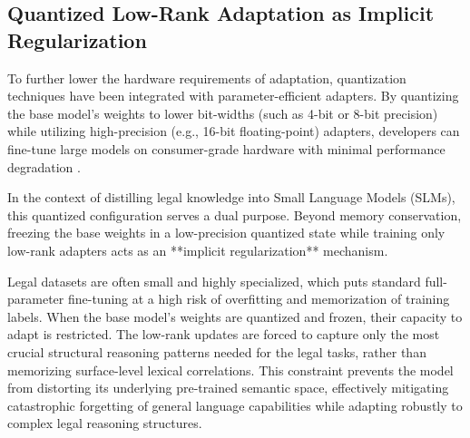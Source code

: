 \subsection{Quantized Low-Rank Adaptation as Implicit Regularization}

To further lower the hardware requirements of adaptation, quantization techniques have been integrated with parameter-efficient adapters. By quantizing the base model's weights to lower bit-widths (such as 4-bit or 8-bit precision) while utilizing high-precision (e.g., 16-bit floating-point) adapters, developers can fine-tune large models on consumer-grade hardware with minimal performance degradation \parencite{dettmers2022llmint88bitmatrixmultiplication, dettmers2023qloraefficientfinetuningquantized}. 

In the context of distilling legal knowledge into Small Language Models (SLMs), this quantized configuration serves a dual purpose. Beyond memory conservation, freezing the base weights in a low-precision quantized state while training only low-rank adapters acts as an **implicit regularization** mechanism. 

Legal datasets are often small and highly specialized, which puts standard full-parameter fine-tuning at a high risk of overfitting and memorization of training labels. When the base model's weights are quantized and frozen, their capacity to adapt is restricted. The low-rank updates are forced to capture only the most crucial structural reasoning patterns needed for the legal tasks, rather than memorizing surface-level lexical correlations. This constraint prevents the model from distorting its underlying pre-trained semantic space, effectively mitigating catastrophic forgetting of general language capabilities while adapting robustly to complex legal reasoning structures.
